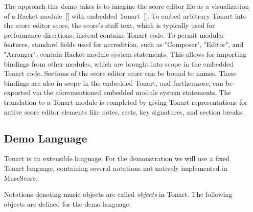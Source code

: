 \documentclass[10pt, sigplan, screen]{acmart}
\let\Footnote\undefined
\newcommand{\textsuper}[1]{$^{\hbox{\textsmaller{#1}}}$}
\let\SOriginalthesubsubsection\thesubsubsection
\newcommand{\Ssubsection}[2]{\subsection[#1]{#2}\let\thesubsubsection\SOriginalthesubsubsection}
\newcommand{\AutobibLink}[1]{\color{ACMPurple}{#1}}
\newcommand{\Autobibref}[1]{#1}
\providecommand{\AutobibLink}[1]{#1}
\newcommand{\Footnote}[1]{\footnote{#1}}
\newcommand{\FootnoteRef}[1]{}
\newcommand{\FootnoteContent}[1]{#1}
\begin{document}
The approach this demo takes is to imagine the score editor file as a
visualization of a Racket module\Autobibref{~[\hyperref[t:x28autobib_x22Flattx2c_MatthewComposable_and_Compilable_Macrosx3a_You_Want_it_Whenx3fIn_Procx2e_ACM_Intlx2e_Confx2e_Functional_Programmingx2c_ppx2e_72x2dx2d832002x22x29]{\AutobibLink{4}}]} with embedded
Tonart\Autobibref{~[\hyperref[t:x28autobib_x22Gentnerx2c_JaredDemox3a_Composable_Compositions_with_TonartIn_Procx2e_12th_ACM_SIGPLAN_International_Workshop_on_Functional_Artx2c_Musicx2c_Modellingx2c_and_Designx2c_ppx2e_42x2dx2d442024httpsx3ax2fx2fdoix2eorgx2f10x2e1145x2f3677996x2e3678294x22x29]{\AutobibLink{2}}]}.  To embed arbitrary Tonart into the score editor
score, the score{'}s staff text, which is typically used for performance
directions, instead contains Tonart code.  To permit modular features, standard
fields used for accredition, such as "Composer", "Editor", and "Arranger",
contain Racket module system statements.  This allows for importing bindings
from other modules, which are brought into scope in the embedded Tonart code.
Sections of the score editor score can be bound to names.  These bindings are
also in scope in the embedded Tonart, and furthermore, can be exported via the
aforementioned embedded module system statements.  The translation to a Tonart
module is completed by giving Tonart representations for native score editor
elements like notes, rests, key signatures, and section breaks.

\Ssubsection{Demo Language}{Demo Language}\label{t:x28part_x22Demox5fLanguagex22x29}

Tonart is an extensible language.  For the demonstration we will use a fixed
Tonart language, containing several notations not natively implemented in MuseScore\Footnote{\FootnoteRef{\textsuper{\hyperref[t:x28x7ccounterx2dx28x29x7c_x23x28structx3ageneratedx2dtagx29x29]{1}}}\FootnoteContent{https://musescore.org/en}}.

Notations denoting music objects are called \emph{objects} in Tonart.
The following objects are defined for the demo language:

\hspace*{\fill}\\


\noindent 
\end{document}
